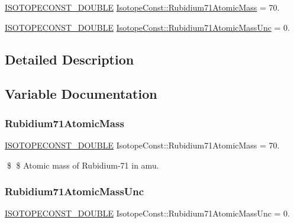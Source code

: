 \begin{DoxyCompactItemize}
\item 
\mbox{\hyperlink{group___isotope_const-_macros_ga8f45a7272ce02c0b4c65c44636ed719a}{I\+S\+O\+T\+O\+P\+E\+C\+O\+N\+S\+T\+\_\+\+D\+O\+U\+B\+LE}} \mbox{\hyperlink{group___isotope_const-_rubidium-_rb71_ga741bc8e1f5282f18d1ee0b9cb2c6dbfb}{Isotope\+Const\+::\+Rubidium71\+Atomic\+Mass}} = 70.
\item 
\mbox{\hyperlink{group___isotope_const-_macros_ga8f45a7272ce02c0b4c65c44636ed719a}{I\+S\+O\+T\+O\+P\+E\+C\+O\+N\+S\+T\+\_\+\+D\+O\+U\+B\+LE}} \mbox{\hyperlink{group___isotope_const-_rubidium-_rb71_ga9070180cfb585f0e9698ecb21d1a3235}{Isotope\+Const\+::\+Rubidium71\+Atomic\+Mass\+Unc}} = 0.
\end{DoxyCompactItemize}


\subsection{Detailed Description}


\subsection{Variable Documentation}
\mbox{\label{group___isotope_const-_rubidium-_rb71_ga741bc8e1f5282f18d1ee0b9cb2c6dbfb}} 
\subsubsection{\texorpdfstring{Rubidium71\+Atomic\+Mass}{Rubidium71AtomicMass}}
{\footnotesize\ttfamily \mbox{\hyperlink{group___isotope_const-_macros_ga8f45a7272ce02c0b4c65c44636ed719a}{I\+S\+O\+T\+O\+P\+E\+C\+O\+N\+S\+T\+\_\+\+D\+O\+U\+B\+LE}} Isotope\+Const\+::\+Rubidium71\+Atomic\+Mass = 70.}

\$ \$ Atomic mass of Rubidium-\/71 in amu. \mbox{\label{group___isotope_const-_rubidium-_rb71_ga9070180cfb585f0e9698ecb21d1a3235}} 
\subsubsection{\texorpdfstring{Rubidium71\+Atomic\+Mass\+Unc}{Rubidium71AtomicMassUnc}}
{\footnotesize\ttfamily \mbox{\hyperlink{group___isotope_const-_macros_ga8f45a7272ce02c0b4c65c44636ed719a}{I\+S\+O\+T\+O\+P\+E\+C\+O\+N\+S\+T\+\_\+\+D\+O\+U\+B\+LE}} Isotope\+Const\+::\+Rubidium71\+Atomic\+Mass\+Unc = 0.}

